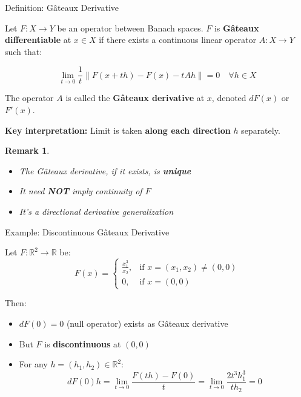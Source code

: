 \documentclass[aspectratio=169,10pt]{beamer}
\newtheorem{remark}[theorem]{Remark}
\begin{document}
\begin{frame}{Definition: Gâteaux Derivative}
  \begin{definition}
    Let $F: X \to Y$ be an operator between Banach spaces. $F$ is \textbf{Gâteaux differentiable} at $x \in X$ if there exists a continuous linear operator $A: X \to Y$ such that:

    \[
      \lim_{t \to 0} \frac{1}{t}\left\|F(x + th) - F(x) - tAh\right\| = 0 \quad \forall h \in X
    \]

    The operator $A$ is called the \textbf{Gâteaux derivative} at $x$, denoted $dF(x)$ or $F'(x)$.
  \end{definition}

  \vspace{0.3cm}
  \textbf{Key interpretation:} Limit is taken \textbf{along each direction} $h$ separately.

  \begin{remark}
    \begin{itemize}
      \item The Gâteaux derivative, if it exists, is \textbf{unique}
      \item It need \textbf{NOT} imply continuity of $F$
      \item It's a directional derivative generalization
    \end{itemize}
  \end{remark}
\end{frame}

\begin{frame}{Example: Discontinuous Gâteaux Derivative}
  \begin{example}[Example 3.1]
    Let $F: \mathbb{R}^2 \to \mathbb{R}$ be:
    \[
      F(x) = \begin{cases}
        \frac{x_1^3}{x_2}, & \text{if } x = (x_1, x_2) \neq (0,0) \\
        0, & \text{if } x = (0,0)
      \end{cases}
    \]

    Then:
    \begin{itemize}
      \item $dF(0) = 0$ (null operator) exists as Gâteaux derivative
      \item But $F$ is \textbf{discontinuous} at $(0,0)$
      \item For any $h = (h_1, h_2) \in \mathbb{R}^2$:
        \[
          dF(0)h = \lim_{t \to 0} \frac{F(th) - F(0)}{t} = \lim_{t \to 0} \frac{2t^3 h_1^3}{t h_2} = 0
        \]
    \end{itemize}
  \end{example}
\end{frame}
\end{document}
